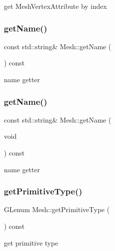 get Mesh\+Vertex\+Attribute by index \mbox{\label{classMesh_a87a6913ba3a4220a77c011ca7f75045d}} 
\subsubsection{\texorpdfstring{get\+Name()}{getName()}\hspace{0.1cm}{\footnotesize\ttfamily [1/2]}}
{\footnotesize\ttfamily const std\+::string\& Mesh\+::get\+Name (\begin{DoxyParamCaption}{ }\end{DoxyParamCaption}) const\hspace{0.3cm}{\ttfamily [inline]}}

name getter \mbox{\label{classMesh_a87a6913ba3a4220a77c011ca7f75045d}} 
\subsubsection{\texorpdfstring{get\+Name()}{getName()}\hspace{0.1cm}{\footnotesize\ttfamily [2/2]}}
{\footnotesize\ttfamily const std\+::string\& Mesh\+::get\+Name (\begin{DoxyParamCaption}\item[{void}]{ }\end{DoxyParamCaption}) const\hspace{0.3cm}{\ttfamily [inline]}}

name getter \mbox{\label{classMesh_a1b3969fa1a815cafb840cb7ab8a83ad7}} 
\subsubsection{\texorpdfstring{get\+Primitive\+Type()}{getPrimitiveType()}\hspace{0.1cm}{\footnotesize\ttfamily [1/2]}}
{\footnotesize\ttfamily G\+Lenum Mesh\+::get\+Primitive\+Type (\begin{DoxyParamCaption}{ }\end{DoxyParamCaption}) const}

get primitive type

